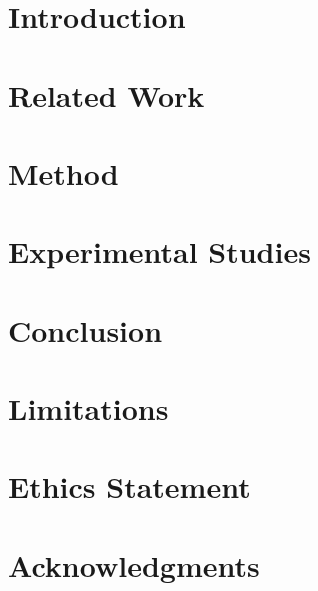 \documentclass[11pt]{article}
\title{}
\author{
  Author One\textsuperscript{*} \quad Author Two\textsuperscript{*} \quad Author Three \\
  Institution Name \\
  \texttt{\{author1, author2, author3\}@institution.edu}
}
\numberwithin{equation}{section}
\begin{document}
\maketitle

\begin{abstract}
  
\end{abstract}

\section{Introduction}
\label{sec:intro}


\section{Related Work}
\label{sec:related}


\section{Method}
\label{sec:method}


\section{Experimental Studies}
\label{sec:exp}


\section{Conclusion}
\label{sec:conclusion}


\section*{Limitations}


\section*{Ethics Statement}


\section*{Acknowledgments}





\appendix

\end{document}
